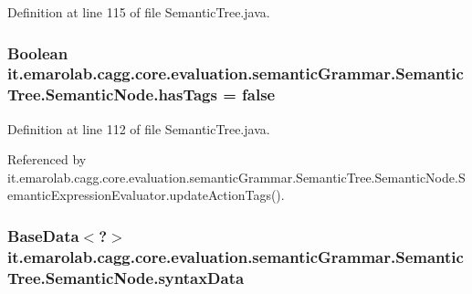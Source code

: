Definition at line 115 of file Semantic\-Tree.\-java.

\hypertarget{classit_1_1emarolab_1_1cagg_1_1core_1_1evaluation_1_1semanticGrammar_1_1SemanticTree_1_1SemanticNode_a2fd76370326531ae7e9b4dcae60c80b8}{
\subsubsection[{has\-Tags}]{\setlength{\rightskip}{0pt plus 5cm}Boolean it.\-emarolab.\-cagg.\-core.\-evaluation.\-semantic\-Grammar.\-Semantic\-Tree.\-Semantic\-Node.\-has\-Tags = false\hspace{0.3cm}{\ttfamily [private]}}}\label{classit_1_1emarolab_1_1cagg_1_1core_1_1evaluation_1_1semanticGrammar_1_1SemanticTree_1_1SemanticNode_a2fd76370326531ae7e9b4dcae60c80b8}


Definition at line 112 of file Semantic\-Tree.\-java.



Referenced by it.\-emarolab.\-cagg.\-core.\-evaluation.\-semantic\-Grammar.\-Semantic\-Tree.\-Semantic\-Node.\-Semantic\-Expression\-Evaluator.\-update\-Action\-Tags().

\hypertarget{classit_1_1emarolab_1_1cagg_1_1core_1_1evaluation_1_1semanticGrammar_1_1SemanticTree_1_1SemanticNode_ac8d3aff7b6fbb8cc2d7f3a3aa1c4d5f1}{
\subsubsection[{syntax\-Data}]{\setlength{\rightskip}{0pt plus 5cm}Base\-Data$<$?$>$ it.\-emarolab.\-cagg.\-core.\-evaluation.\-semantic\-Grammar.\-Semantic\-Tree.\-Semantic\-Node.\-syntax\-Data\hspace{0.3cm}{\ttfamily [private]}}}\label{classit_1_1emarolab_1_1cagg_1_1core_1_1evaluation_1_1semanticGrammar_1_1SemanticTree_1_1SemanticNode_ac8d3aff7b6fbb8cc2d7f3a3aa1c4d5f1}


